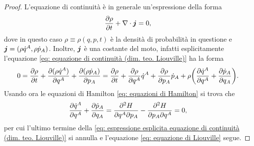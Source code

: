 \begin{proof}
    L'equazione di continuità è in generale un'espressione della forma
    \begin{equation}
    \label{eq: equazione di continuità (dim. teo. Liouville)}
        \frac{\partial \rho}{\partial t} + \nabla\cdot\bm{j} = 0,
    \end{equation}
    dove in questo caso $\rho \equiv \rho(q,p,t)$ è la densità di probabilità in questione e $\bm{j} = (\rho\dot{q}^A,\rho\dot{p}_A)$. Inoltre, $\bm{j}$ è una costante del moto, infatti esplicitamente l'equazione \eqref{eq: equazione di continuità (dim. teo. Liouville)} ha la forma
    \begin{equation}
    \label{eq: espressione esplicita equazione di continuità (dim. teo. Liouville)}
        0 = \frac{\partial\rho}{\partial t} + \frac{\partial(\rho\dot{q}^A)}{\partial q^A} + \frac{\partial(\rho\dot{p}_A)}{\partial p_A} = \frac{\partial\rho}{\partial t} +  \frac{\partial\rho}{\partial q^A}\dot{q}^A + \frac{\partial\rho}{\partial p_A}\dot{p}_A + \rho\bigg(\frac{\partial\dot{q}^A}{\partial q^A} + \frac{\partial\dot{p}_A}{\partial q_A}\bigg).
    \end{equation}
    Usando ora le equazioni di Hamilton \eqref{eq: equazioni di Hamilton} si trova che 
    \begin{equation}
        \frac{\partial\dot{q}^A}{\partial q^A} + \frac{\partial\dot{p}_A}{\partial q_A} = \frac{\partial^2H}{\partial q^A\partial p_A} -\frac{\partial^2H}{\partial p_A\partial q^A} = 0,
    \end{equation}
    per cui l'ultimo termine della \eqref{eq: espressione esplicita equazione di continuità (dim. teo. Liouville)} si annulla e l'equazione \eqref{eq: equazione di Liouville} segue.
\end{proof}
